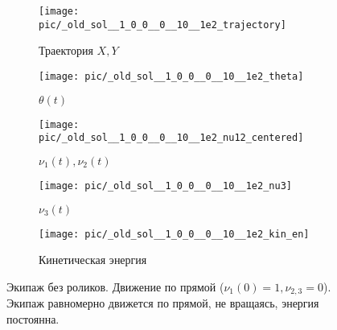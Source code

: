 \begin{figure}
    \centering
    \begin{subfigure}[t]{0.3\textwidth}
        \centering
        \texttt{[image: pic/\_old\_sol\_\_1\_0\_0\_\_0\_\_10\_\_1e2\_trajectory]}
        \caption{Траектория $X, Y$}
        \label{fig:_old_sol__1_0_0__0__10__1e2_trajectory}
    \end{subfigure}
    \begin{subfigure}[t]{0.3\textwidth}
        \centering
        \texttt{[image: pic/\_old\_sol\_\_1\_0\_0\_\_0\_\_10\_\_1e2\_theta]}
        \caption{$\theta(t)$}
        \label{fig:_old_sol__1_0_0__0__10__1e2_theta}
    \end{subfigure}
    \vspace{12pt}
    
    \begin{subfigure}[t]{0.3\textwidth}
        \centering
        \texttt{[image: pic/\_old\_sol\_\_1\_0\_0\_\_0\_\_10\_\_1e2\_nu12\_centered]}
        \caption{$\nu_1(t), \nu_2(t)$}
        \label{fig:_old_sol__1_0_0__0__10__1e2_nu12_centered}    
    \end{subfigure}
    \hfill
    \begin{subfigure}[t]{0.3\textwidth}
        \centering
        \texttt{[image: pic/\_old\_sol\_\_1\_0\_0\_\_0\_\_10\_\_1e2\_nu3]} \\
        \caption{$\nu_3(t)$}
        \label{fig:_old_sol__1_0_0__0__10__1e2_nu3}
    \end{subfigure}
    \hfill
    \begin{subfigure}[t]{0.3\textwidth}
        \centering
        \texttt{[image: pic/\_old\_sol\_\_1\_0\_0\_\_0\_\_10\_\_1e2\_kin\_en]}
        \caption{Кинетическая энергия}
        \label{fig:_old_sol__1_0_0__0__10__1e2_kin_en}
    \end{subfigure}
    
    \caption{Экипаж без роликов. Движение по прямой ($\nu_1(0) = 1, \nu_{2,3} = 0$). Экипаж равномерно движется по прямой, не вращаясь, энергия постоянна.}
    \label{fig:old_straight}
\end{figure}
